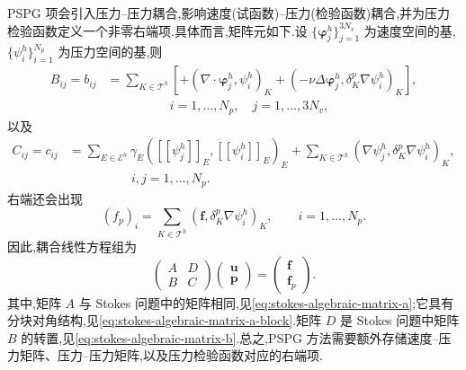 \begin{note}[实现]\label{note:stokes-pspg-implementation}
PSPG 项会引入压力--压力耦合,影响速度(试函数)--压力(检验函数)耦合,并为压力检验函数定义一个非零右端项.具体而言,矩阵元如下.设 $\{\symbf{\varphi}_j^h\}_{j=1}^{3N_v}$ 为速度空间的基,$\{\psi_i^h\}_{i=1}^{N_p}$ 为压力空间的基,则
\[
\begin{aligned}
 B_{ij}=b_{ij}
 &=\sum_{K\in\mathcal{T}^h}\left[
   +(\nabla\cdot\symbf{\varphi}_j^h,\psi_i^h)_K
   +(-\nu\Delta\symbf{\varphi}_j^h,\delta_K^p\nabla\psi_i^h)_K
   \right],\\
 &\hspace{5em}i=1,\ldots,N_p,\quad j=1,\ldots,3N_v,
\end{aligned}
\]
以及
\[
\begin{aligned}
 C_{ij}=c_{ij}
 &=\sum_{E\in\mathcal{E}^h}\gamma_E
       ([[\psi_j^h]]_E,[[\psi_i^h]]_E)_E
   +\sum_{K\in\mathcal{T}^h}
       (\nabla\psi_j^h,\delta_K^p\nabla\psi_i^h)_K,\\
 &\hspace{5em}i,j=1,\ldots,N_p.
\end{aligned}
\]
右端还会出现
\[
 (f_p)_i=\sum_{K\in\mathcal{T}^h}
       (\bm{f},\delta_K^p\nabla\psi_i^h)_K,
 \qquad i=1,\ldots,N_p.
\]
因此,耦合线性方程组为
\[
 \begin{pmatrix}A&D\\B&C\end{pmatrix}
 \begin{pmatrix}\bm{u}\\\bm{p}\end{pmatrix}
 =
 \begin{pmatrix}\bm{f}\\\bm{f}_p\end{pmatrix}.
\]
其中,矩阵 $A$ 与 Stokes 问题中的矩阵相同,见\cref{eq:stokes-algebraic-matrix-a};它具有分块对角结构,见\cref{eq:stokes-algebraic-matrix-a-block}.矩阵 $D$ 是 Stokes 问题中矩阵 $B$ 的转置,见\cref{eq:stokes-algebraic-matrix-b}.总之,PSPG 方法需要额外存储速度--压力矩阵、压力--压力矩阵,以及压力检验函数对应的右端项.
\end{note}

